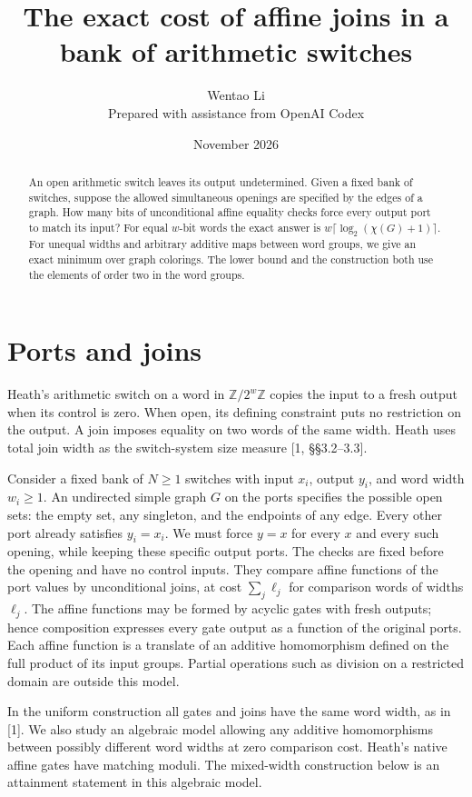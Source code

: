 \documentclass[11pt]{article}
\title{The exact cost of affine joins in a bank of arithmetic switches}
\author{Wentao Li\\[2pt]\small Prepared with assistance from OpenAI Codex}
\date{November 2026}
\newcommand{\Z}{\mathbb Z}
\begin{document}
\maketitle
\begin{abstract}
An open arithmetic switch leaves its output undetermined. Given a fixed bank of switches, suppose the allowed simultaneous openings are specified by the edges of a graph. How many bits of unconditional affine equality checks force every output port to match its input? For equal $w$-bit words the exact answer is $w\lceil\log_2(\chi(G)+1)\rceil$. For unequal widths and arbitrary additive maps between word groups, we give an exact minimum over graph colorings. The lower bound and the construction both use the elements of order two in the word groups.
\end{abstract}

\section{Ports and joins}
Heath's arithmetic switch on a word in $\Z/2^w\Z$ copies the input to a fresh output when its control is zero. When open, its defining constraint puts no restriction on the output. A join imposes equality on two words of the same width. Heath uses total join width as the switch-system size measure [1, \S\S3.2--3.3].

Consider a fixed bank of $N\ge1$ switches with input $x_i$, output $y_i$, and word width $w_i\ge1$. An undirected simple graph $G$ on the ports specifies the possible open sets: the empty set, any singleton, and the endpoints of any edge. Every other port already satisfies $y_i=x_i$. We must force $y=x$ for every $x$ and every such opening, while keeping these specific output ports. The checks are fixed before the opening and have no control inputs. They compare affine functions of the port values by unconditional joins, at cost $\sum_j\ell_j$ for comparison words of widths $\ell_j$. The affine functions may be formed by acyclic gates with fresh outputs; hence composition expresses every gate output as a function of the original ports. Each affine function is a translate of an additive homomorphism defined on the full product of its input groups. Partial operations such as division on a restricted domain are outside this model.

In the uniform construction all gates and joins have the same word width, as in [1]. We also study an algebraic model allowing any additive homomorphisms between possibly different word widths at zero comparison cost. Heath's native affine gates have matching moduli. The mixed-width construction below is an attainment statement in this algebraic model.
\end{document}
